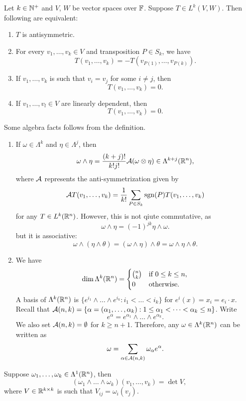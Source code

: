 \documentclass[a4paper]{article}
\begin{document}
\begin{thm}
Let $k \in \mathbb{N}^+$ and $V$, $W$ be vector spaces over $\mathbb{F}$. 
Suppose $T \in L^k(V, W)$. Then following are equivalent:
\begin{enumerate}
\item $T$ is antisymmetric. 
\item For every $v_1, \dots, v_k \in V$ and transposition 
$P \in S_k$, we have 
\[
T(v_1, \dots, v_k) = -T (v_{P(1)}, \dots, v_{P(k)}).
\]
\item If $v_1, \dots, v_k$ is such that $v_i = v_j$ for some 
$i \neq j$, then 
\[
T(v_1, \dots, v_k) = 0.
\]
\item If $v_1, \dots, v_l \in V$ are linearly dependent, 
then 
\[
T(v_1, \dots, v_k) = 0.
\]
\end{enumerate}
\end{thm}

Some algebra facts follows from the definition.
\begin{enumerate}
\item If $\omega \in \Lambda^k$ and $\eta \in \Lambda^j$,
then
\[
\omega \wedge \eta = \frac{(k+j)!}{k! j!} \mathcal{A} (\omega
\otimes \eta) \in \Lambda^{k+j}(\mathbb{R}^n),
\]
where $\mathcal{A}$ represents the anti-symmetrization given by 
\[
\mathcal{A} T(v_1, \dots, v_k) = \frac{1}{k!} 
\sum_{P \in S_k} \operatorname{sgn}(P) T(v_1, \dots, v_k)
\]
for any $T \in L^k(\mathbb{R}^n)$. 
However, this is not qiute commutative, as
\[
\omega \wedge \eta = (-1)^{jk} \eta \wedge \omega.
\]
but it is associative:
\[
\omega \wedge (\eta \wedge \theta)
= (\omega \wedge \eta) \wedge \theta
= \omega \wedge \eta \wedge \theta.
\]

\item We have
\[
\dim \Lambda^k(\mathbb{R}^n) = \begin{cases}
  \binom{n}{k} & \text{if $0 \leq k \leq n$},\\
  0 & \text{otherwise}.
\end{cases}
\]
A basis of $\Lambda^k (\mathbb{R}^n)$ is
$\{e^{i_1} \wedge \dots \wedge e^{i_k} : i_1 < \dots < i_k\}$
for $e^i (x) = x_i = e_i \cdot x$.
Recall that $\mathcal{A}(n, k) = \{\alpha = (\alpha_1, \dots,
\alpha_k) : 1 \leq \alpha_1 < \dots < \alpha_k \leq n\}$.
Write
\[
e^{\alpha} = e^{\alpha_1} \wedge \dots \wedge
e^{\alpha_k}.
\]
We also set $\mathcal{A}(n, k) = \emptyset$
for $k \geq n + 1$.
Therefore, any $\omega \in \Lambda^k(\mathbb{R}^n)$
can be written as
\[
\omega = \sum_{\alpha \in \mathcal{A}(n, k)}
\omega_\alpha e^{\alpha}.
\]
\end{enumerate}

\begin{prop} 
Suppose $\omega_1, \dots, \omega_k \in \Lambda^1 
(\mathbb{R}^n)$, then 
\[
(\omega_1 \wedge \dots \wedge \omega_k) 
(v_1, \dots, v_k) = \det V,
\]
where $V \in \mathbb{R}^{k \times k}$ is such that $V_{ij} = \omega_i 
(v_j)$.
\end{prop}
\end{document}
